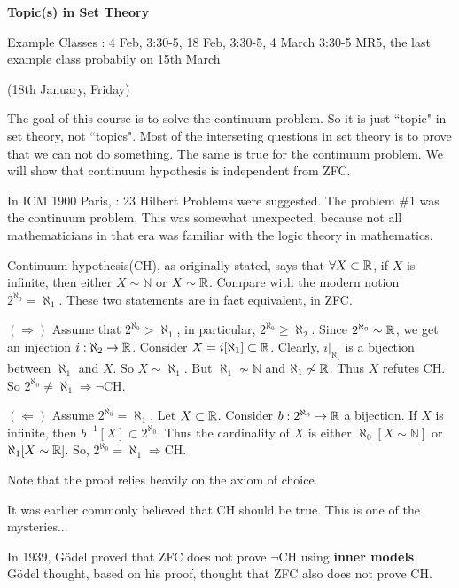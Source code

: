 \documentclass[12pt,a4paper]{article}
\newenvironment{proof}
{\begin{changemargin}{0.5cm}{0.5cm} 
	}%
	{\end{changemargin}
}
\newenvironment{p}
{\begin{proof} 
	}%
	{\end{proof}
}
\begin{document}
\setlength\parindent{0pt}
\s

\textbf{Topic(s) in Set Theory}

Example Classes : 4 Feb, 3:30-5, 18 Feb, 3:30-5, 4 March 3:30-5 MR5, the last example class probabily on 15th March
\s

\newday

(18th January, Friday)
\s

The goal of this course is to solve the continuum problem. So it is just ``topic" in set theory, not ``topics". Most of the interseting questions in set theory is to prove that we can not do something. The same is true for the continuum problem. We will show that continuum hypothesis is independent from ZFC.
\s

In ICM 1900 Paris, : 23 Hilbert Problems were suggested. The problem \#1 was the continuum problem. This was somewhat unexpected, because not all mathematicians in that era was familiar with the logic theory in mathematics.
\s

Continuum hypothesis(CH), as originally stated, says that $\forall X\subset \mathbb{R}$, if $X$ is infinite, then either $X\sim \mathbb{N}$ or $X\sim \mathbb{R}$. Compare with the modern notion $2^{\aleph_0} = \aleph_1$. These two statements are in fact equivalent, in ZFC.
\begin{p}
$(\Rightarrow)$ Assume that $2^{\aleph_0} > \aleph_1$, in particular, $2^{\aleph_0} \geq \aleph_2$. Since $2^{\aleph_0}\sim \mathbb{R}$, we get an injection $i: \aleph_2 \rightarrow \mathbb{R}$. Consider $X = i[\aleph_1] \subset \mathbb{R}$. Clearly, $i|_{\aleph_1}$ is a bijection between $\aleph_1$ and $X$. So $X\sim \aleph_1$. But $\aleph_1 \not\sim \mathbb{N}$ and $\aleph_1 \not\sim \mathbb{R}$. Thus $X$ refutes CH. So $2^{\aleph_0} \neq \aleph_1 \Rightarrow \neg \text{CH}$.
\s

$(\Leftarrow)$ Assume $2^{\aleph_0} = \aleph_1$. Let $X\subset \mathbb{R}$. Consider $b: 2^{\aleph_0}\rightarrow \mathbb{R}$ a bijection. If $X$ is infinite, then $b^{-1} [X] \subset 2^{\aleph_0}$. Thus the cardinality of $X$ is either $\aleph_0[X\sim \mathbb{N}]$ or $\aleph_1[X\sim \mathbb{R}]$. So, $2^{\aleph_0}= \aleph_1 \Rightarrow \text{CH}$.
\end{p}
Note that the proof relies heavily on the axiom of choice.
\s

It was earlier commonly believed that CH should be true. This is one of the mysteries...
\s

In 1939, G\"{o}del proved that ZFC does not prove $\neg \text{CH}$ using \textbf{inner models}. G\"{o}del thought, based on his proof, thought that ZFC also does not prove CH. 
\end{document}
